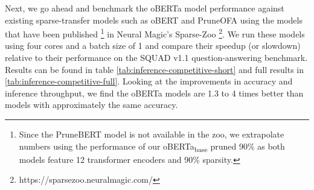 
Next, we go ahead and benchmark the oBERTa model performance against existing sparse-transfer models such as oBERT and PruneOFA using the models that have been published \footnote{Since the PruneBERT model is not available in the zoo, we extrapolate numbers using the performance of our oBERTa\textsubscript{base} pruned 90\% as both models feature 12 transformer encoders and 90\% sparsity.} in Neural Magic's Sparse-Zoo \footnote{https://sparsezoo.neuralmagic.com/}. We run these models using four cores and a batch size of 1 and compare their speedup (or slowdown) relative to their performance on the SQUAD v1.1 question-answering benchmark. Results can be found in table \ref{tab:inference-competitive-short} and full results in \ref{tab:inference-competitive-full}. Looking at the improvements in accuracy and inference throughput, we find the oBERTa models are 1.3 to 4 times better than models with approximately the same accuracy.  \\
